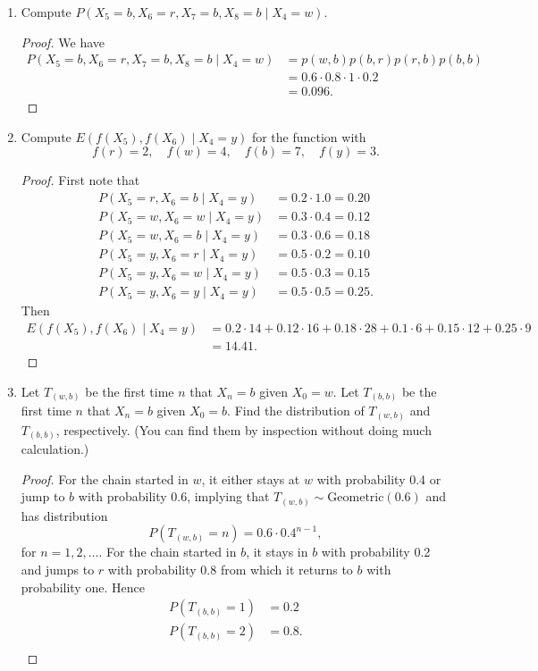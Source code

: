 \documentclass[oneside,reqno]{amsart}
\newcommand{\Geom}{\text{Geometric}}
\theoremstyle{definition}
\begin{document}
\begin{enumerate}
\item
Compute $P(X_5 = b, X_6 = r, X_7 = b, X_8 = b \mid X_4 = w)$.
\begin{proof}
We have 
\begin{align*}
	P(X_5 = b, X_6 = r, X_7 = b, X_8 = b \mid X_4 = w) &= p(w,b)p(b,r)p(r,b) p(b,b) \\
	&= 0.6 \cdot 0.8 \cdot 1 \cdot 0.2 \\
	&= 0.096.
\end{align*}
\end{proof}
\item
Compute $E(f(X_5), f(X_6) \mid X_4 = y)$ for the function with 
\[
	f(r) = 2, \quad f(w) = 4, \quad f(b) = 7, \quad f(y) =3.
\]
\begin{proof}
First note that
\begin{align*}
	P(X_5 = r, X_6 = b \mid X_4 = y) &= 0.2 \cdot 1.0  =  0.20 \\
	P(X_5 = w, X_6 = w \mid X_4 = y) &= 0.3 \cdot 0.4 = 0.12 \\
	P(X_5 = w, X_6 = b \mid X_4 = y) &= 0.3 \cdot 0.6 = 0.18 \\	
	P(X_5 = y, X_6 = r \mid X_4 = y) &= 0.5 \cdot 0.2 = 0.10 \\
	P(X_5 = y, X_6 = w \mid X_4 = y) &= 0.5 \cdot 0.3 = 0.15 \\
	P(X_5 = y, X_6 = y \mid X_4 = y) &= 0.5 \cdot 0.5 = 0.25.
\end{align*}
Then
\begin{align*}
	E(f(X_5), f(X_6) \mid X_4 = y) &= 0.2 \cdot 14 + 0.12 \cdot 16 + 0.18 \cdot 28 + 0.1 \cdot 6 + 0.15 \cdot 12 + 0.25 \cdot 9 \\
	&= 14.41.
\end{align*}
\end{proof}
\item
Let $T_{(w,b)}$ be the first time $n$ that $X_n = b$ given $X_0 = w$. Let $T_{(b,b)}$ be the first time $n$ that $X_n = b$ given $X_0 = b$. Find the distribution of $T_{(w,b)}$ and $T_{(b,b)}$, respectively. (You can find them by inspection without doing much calculation.)
\begin{proof}
For the chain started in $w$, it either stays at $w$ with probability 0.4 or jump to $b$ with probability 0.6, implying that $T_{(w,b)} \sim \Geom(0.6)$ and has distribution 
\[
	P(T_{(w,b)} = n) = 0.6 \cdot 0.4^{n-1},
\]
for $n=1,2,\dotsc$. For the chain started in $b$, it stays in $b$ with probability 0.2 and jumps to $r$ with probability 0.8 from which it returns to $b$ with probability one. Hence 
\begin{align*}
	P(T_{(b,b)} = 1) &= 0.2 \\
	P(T_{(b,b)} = 2) &= 0.8. \\
\end{align*}
\end{proof}
\end{enumerate}
\end{document}
